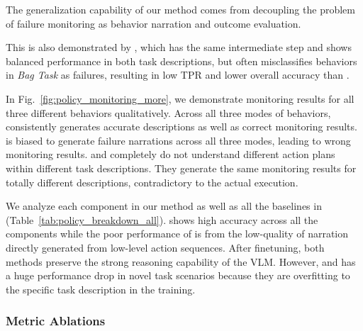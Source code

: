 The generalization capability of our method comes from decoupling the problem of failure monitoring as behavior narration and outcome evaluation. 

This is also demonstrated by \vlmact, which has the same intermediate step and shows balanced performance in both task descriptions, but \vlmact often misclassifies behaviors in \textit{Bag Task} as failures, resulting in low TPR and lower overall accuracy than \ours.

 In Fig.~\ref{fig:policy_monitoring_more}, we demonstrate monitoring results for all three different behaviors qualitatively. Across all three modes of behaviors, \ours consistently generates accurate descriptions as well as correct monitoring results. \vlmact is biased to generate failure narrations across all three modes, leading to wrong monitoring results. \classdynlatent and \vlmdynlatentbin completely do not understand different action plans within different task descriptions. They generate the same monitoring results for totally different descriptions, contradictory to the actual execution.

We analyze each component in our method as well as all the baselines in (Table~\ref{tab:policy_breakdown_all}). 
\ours shows high accuracy across all the components while the poor performance of \vlmact is from the low-quality of narration directly generated from low-level action sequences. After finetuning, both methods preserve the strong reasoning capability of the VLM. However, \classdynlatent and \vlmdynlatentbin has a huge performance drop in novel task scenarios because they are overfitting to the specific task description in the training.
\\

\subsubsection{Metric Ablations}\hfill 
\label{sec:appendix_ablations}

